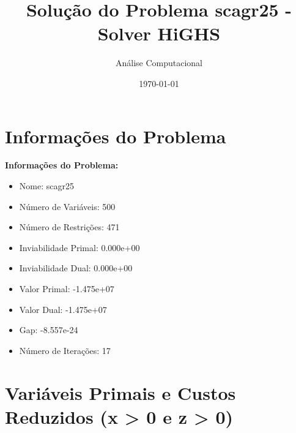 \documentclass[12pt]{article}
\title{Solução do Problema scagr25 - Solver HiGHS}
\author{Análise Computacional}
\date{\today}
\begin{document}
\maketitle

\section{Informações do Problema}

\textbf{Informações do Problema:}
\begin{itemize}
\item Nome: scagr25
\item Número de Variáveis: 500
\item Número de Restrições: 471
\item Inviabilidade Primal: 0.000e+00
\item Inviabilidade Dual: 0.000e+00
\item Valor Primal: -1.475e+07
\item Valor Dual: -1.475e+07
\item Gap: -8.557e-24
\item Número de Iterações: 17
\end{itemize}


\section{Variáveis Primais e Custos Reduzidos (x > 0 e z > 0)}
\end{document}
